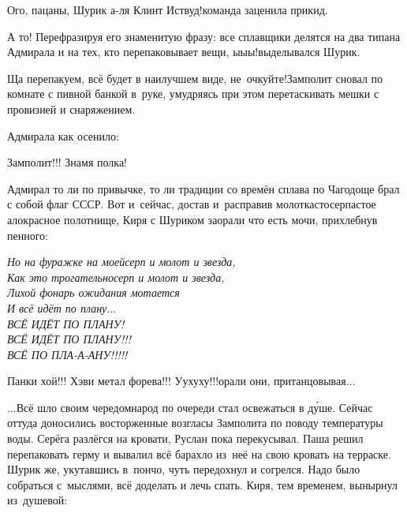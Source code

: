 \diagdash Ого, пацаны, Шурик а-ля Клинт Иствуд!\mdash команда заценила прикид.

\diagdash А то! Перефразируя его знаменитую фразу: все сплавщики делятся на два типа\mdash на Адмирала и на тех, кто перепаковывает вещи, ы\sdash ы\sdash ы!\mdash выделывался Шурик.

\diagdash Ща перепакуем, всё будет в наилучшем виде, не~очкуйте!\mdash Замполит сновал по комнате с пивной банкой в~руке, умудряясь при этом перетаскивать мешки с провизией и снаряжением.

Адмирала как осенило:

\diagdash Замполит!!! Знамя полка!

Адмирал то ли по привычке, то ли традиции со времён сплава по Чагодоще брал с собой флаг СССР. Вот и~сейчас, достав и~расправив молоткасто\sdash серпастое ало\sdash красное полотнище, Киря с Шуриком заорали что есть мочи, прихлебнув пенного:

\newpage
\vspace{0.5cm}
\noindent\textit{%
	\hspace*{1.2cm}Но на фуражке на моей\mdash серп и молот и звезда,\\
	\hspace*{1.2cm}Как это трогательно\mdash серп и молот и звезда,\\
	\hspace*{1.2cm}Лихой фонарь ожидания мотается\\
	\hspace*{1.2cm}И всё идёт по плану$\ldots$\\
	\hspace*{1.2cm}\large{ВСЁ ИДЁТ ПО ПЛАНУ!}\\
	\hspace*{1.2cm}\Large{ВСЁ ИДЁТ ПО ПЛАНУ!!!}\\
	\hspace*{1.2cm}\LARGE{ВСЁ ПО ПЛА-А-АНУ!!!!!}
}

\vspace{0.5cm}
\diagdash Панки хой!!! Хэви метал форева!!! У\sdash у\sdash х\sdash у\sdash х\sdash у!!!\mdash орали они, пританцовывая$\ldots$

$\ldots$Всё шло своим чередом\mdash народ по очереди стал освежаться в д\'{у}ше. Сейчас оттуда доносились восторженные возгласы Замполита по поводу температуры воды. Серёга разлёгся на кровати, Руслан пока перекусывал. Паша решил перепаковать герму и вывалил всё барахло из~неё на свою кровать на терраске. Шурик же, укутавшись в~пончо, чуть передохнул и согрелся. Надо было собраться с~мыслями, всё доделать и лечь спать. Киря, тем временем, вынырнул из~душевой:

